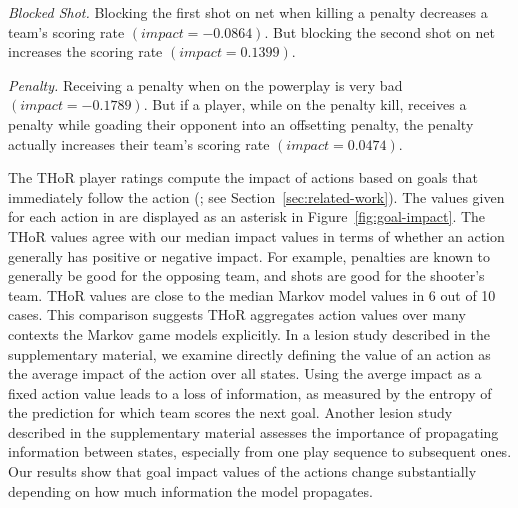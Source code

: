 \documentclass[]{article}
\begin{document}
{\em Blocked Shot.} Blocking the first shot on net when killing a penalty decreases a team's scoring rate $(impact=-0.0864)$. But blocking the second shot on net increases the scoring rate $(impact=0.1399)$.

{\em Penalty.} Receiving a penalty when on the powerplay is very bad $(impact=-0.1789)$. But if a player, while on the penalty kill, receives a penalty while goading their opponent into an offsetting penalty, the penalty actually increases their team's scoring rate $(impact=0.0474)$.

The THoR player ratings compute the impact of actions based on goals that immediately follow the action (\citep{Lock2009,Schuckers2011}; see Section~\ref{sec:related-work}).
The values given for each action in \citep{Lock2009} are displayed as an asterisk in Figure~\ref{fig:goal-impact}.
%
The THoR values
agree with our median impact values in terms of whether an action generally has positive or negative impact. For example, penalties are known to generally be good for the opposing team, and shots are good for the shooter's team. THoR values are close to the median Markov model values in 6 out of 10 cases.
This comparison suggests THoR aggregates action values over many contexts the Markov game models explicitly. In a lesion study described in the supplementary material, we examine directly defining the value of an action as the average impact of the action over all states. Using the averge impact as a fixed action value leads to a loss of information, as measured by the entropy of the prediction for which team scores the next goal. Another lesion study described in the supplementary material assesses the importance of propagating information between states, especially from one play sequence to subsequent ones. Our results show that goal impact values of the actions change substantially depending on how much information the model propagates.
\end{document}
